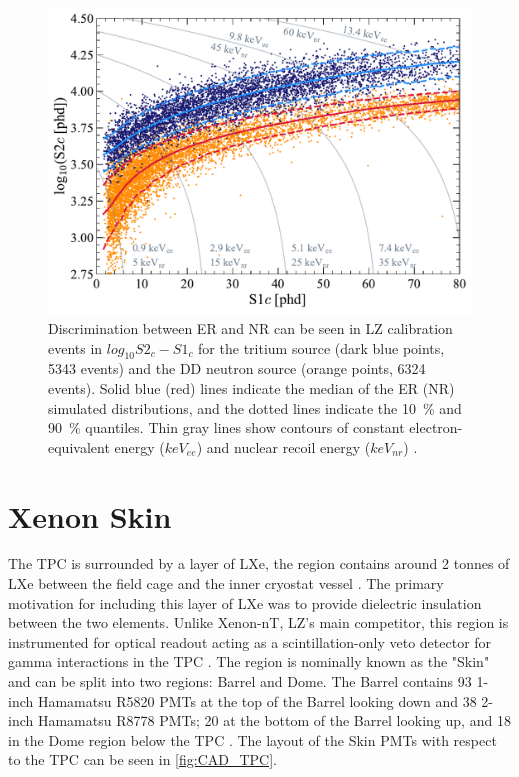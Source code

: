 \begin{figure}
    \centering
    \includegraphics[width=0.75\linewidth]{figures/LZ/SR1WS_calOnly_0629.pdf}
    \caption{Discrimination between ER and NR can be seen in LZ calibration events in $log_{10}S2_{c}-S1_{c}$ for the tritium source (dark blue points, 5343 events) and the DD neutron source (orange points, 6324 events). Solid blue (red) lines indicate the median of the ER (NR) simulated distributions, and the dotted lines indicate the 10~\% and 90~\% quantiles. Thin gray lines show contours of constant electron-equivalent energy ($keV_{ee}$) and nuclear recoil energy ($keV_{nr}$) \cite{LZ:2022lsv}.}
    \label{fig:NRERBandExample}
\end{figure}

\section{Xenon Skin}
The TPC is surrounded by a layer of LXe, the region contains around 2 tonnes of LXe between the field cage and the inner cryostat vessel \cite{LZNIMA}. The primary motivation for including this layer of LXe was to provide dielectric insulation between the two elements. Unlike Xenon-nT, LZ's main competitor, this region is instrumented for optical readout acting as a scintillation-only veto detector for gamma interactions in the TPC \cite{XENON:2024wpa}. The region is nominally known as the "Skin" and can be split into two regions: Barrel and Dome. The Barrel contains 93 1-inch Hamamatsu R5820 PMTs at the top of the Barrel looking down and 38 2-inch Hamamatsu R8778 PMTs; 20 at the bottom of the Barrel looking up, and 18 in the Dome region below the TPC \cite{LZNIMA}. The layout of the Skin PMTs with respect to the TPC can be seen in \autoref{fig:CAD_TPC}.

